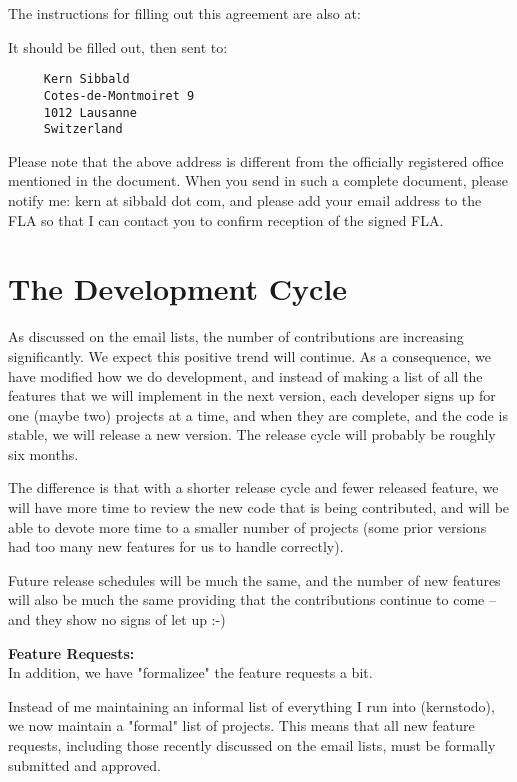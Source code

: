 The instructions for filling out this agreement are also at:

It should be filled out, then sent to:

\begin{verbatim}
     Kern Sibbald
     Cotes-de-Montmoiret 9
     1012 Lausanne
     Switzerland
\end{verbatim}

Please note that the above address is different from the officially
registered office mentioned in the document.  When you send in such a
complete document, please notify me: kern at sibbald dot com, and 
please add your email address to the FLA so that I can contact you
to confirm reception of the signed FLA.


\section{The Development Cycle}

As discussed on the email lists, the number of contributions are
increasing significantly.  We expect this positive trend
will continue.  As a consequence, we have modified how we do
development, and instead of making a list of all the features that we will
implement in the next version, each developer signs up for one (maybe
two) projects at a time, and when they are complete, and the code
is stable, we will release a new version.  The release cycle will probably
be roughly six months.

The difference is that with a shorter release cycle and fewer released
feature, we will have more time to review the new code that is being
contributed, and will be able to devote more time to a smaller number of
projects (some prior versions had too many new features for us to handle
correctly).

Future release schedules will be much the same, and the
number of new features will also be much the same providing that the
contributions continue to come -- and they show no signs of let up :-)

{\bf Feature Requests:} \\
In addition, we have "formalizee" the feature requests a bit.

Instead of me maintaining an informal list of everything I run into 
(kernstodo), we now maintain a "formal" list of projects.  This 
means that all new feature requests, including those recently discussed on 
the email lists, must be formally submitted and approved. 

